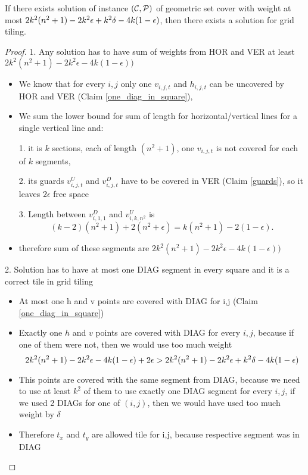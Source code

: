 \begin{lemma}
	If there exists solution  of instance $(\mathcal{C}, \mathcal{P})$
	of geometric set cover
	with weight at most $2k^2(n^2+1) - 2k^2\epsilon +k^2\delta -4k(1-\epsilon)$,
	then there exists a solution for grid tiling.
\end{lemma}

\begin{proof}
1. Any solution has to have sum of weights from HOR and VER at least
$2k^2(n^2+1) -2k^2\epsilon -4k(1-\epsilon))$
\begin{itemize}
\item We know that for every $i,j$ only one $v_{i,j,t}$ and $h_{i,j,t}$
can be uncovered by HOR and VER (Claim \ref{one_diag_in_square}),
\item We sum the lower bound for sum of length for horizontal/vertical
lines for a single vertical line and:

1. it is $k$ sections, each
of length $(n^2+1)$, one $v_{i,j,t}$ is not covered for each of $k$ segments,

2. its guards $v^U_{i,j,t}$ and $v^D_{i,j,t}$
have to be covered in VER (Claim \ref{guards}), so it leaves $2\epsilon$
free space

3. Length between $v^D_{i, 1, 1}$ and $v^U_{i, k, n^2}$
is $$(k-2)(n^2+1) + 2(n^2 + \epsilon) = k(n^2+1) - 2(1 - \epsilon).$$

\item
therefore sum of these segments are
$2k^2(n^2+1) -2k^2\epsilon -4k(1-\epsilon))$
\end{itemize}

2. Solution has to have at most one DIAG segment in every square
and it is a correct tile in grid tiling
\begin{itemize}
\item At most one h and v points are covered with DIAG for i,j
	(Claim \ref{one_diag_in_square})
\item Exactly one $h$ and $v$ points are covered with DIAG for every $i,j$,
because if one of them were not, then we would use too much weight
$$2k^2(n^2+1) -2k^2\epsilon -4k(1-\epsilon) + 2\epsilon > 2k^2(n^2+1) - 2k^2\epsilon +k^2\delta -4k(1-\epsilon)$$
\item This points are covered with the same segment from DIAG,
because we need to use at least $k^2$ of them to use
exactly one DIAG segment for every $i,j$, if we used 2 DIAGs
for one of $(i,j)$, then we would have used too much weight by $\delta$
\item Therefore $t_x$ and $t_y$ are allowed tile for i,j,
because respective segment was in DIAG
\end{itemize}


\end{proof}
